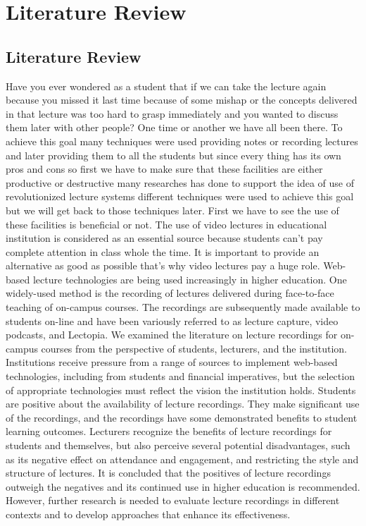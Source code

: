 
\chapter{Literature Review} %
\label{Chapter2}

\section{Literature Review}
Have you ever wondered as a student that if we can take the lecture again because you missed it last time because of some mishap or the concepts delivered in that lecture was too hard to grasp immediately and you wanted to discuss them later with other people? One time or another we have all been there. To achieve this goal many techniques were used providing notes or recording lectures and later providing them to all the students but since every thing has its own pros and cons so first we have to make sure that these facilities are either productive or destructive many researches has done to support the idea of use of revolutionized lecture systems different techniques were used to achieve this goal but we will get back to those techniques later. First we have to see the use of these facilities is beneficial or not.
The use of video lectures in educational institution is considered as an essential source because students can't pay complete attention in class whole the time. It is important to provide an alternative as good as possible that's why video lectures pay a huge role. Web-based lecture technologies are being used increasingly in higher education. One widely-used method is the recording of lectures delivered during face-to-face teaching of on-campus courses. The recordings are subsequently made available to students on-line and have been variously referred to as lecture capture, video podcasts, and Lectopia. We examined the literature on lecture recordings for on-campus courses from the perspective of students, lecturers, and the institution. Institutions receive pressure from a range of sources to implement web-based technologies, including from students and financial imperatives, but the selection of appropriate technologies must reflect the vision the institution holds. Students are positive about the availability of lecture recordings. They make significant use of the recordings, and the recordings have some demonstrated benefits to student learning outcomes. Lecturers recognize the benefits of lecture recordings for students and themselves, but also perceive several potential disadvantages, such as its negative effect on attendance and engagement, and restricting the style and structure of lectures. It is concluded that the positives of lecture recordings outweigh the negatives and its continued use in higher education is recommended. However, further research is needed to evaluate lecture recordings in different contexts and to develop approaches that enhance its effectiveness.\cite{OCallaghan2017}\\
